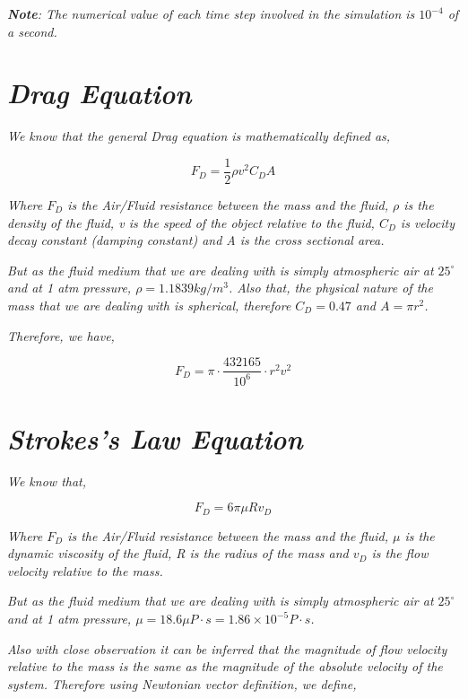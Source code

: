 	\textit{\textbf{Note}: The numerical value of each time step involved in the simulation is $10^{-4}$ of a second.}
           
\section{\textit{Drag Equation}}
            
    \textit{We know that the general Drag equation is mathematically defined as,}
            
        $$F_D = \frac{1}{2}\rho v^2C_DA$$
           
    \textit{Where $F_D$ is the Air/Fluid resistance between the mass and the fluid, $\rho$ is the density of the fluid, v is the speed of the object relative to the fluid, $C_D$ is velocity decay constant (damping constant) and A is the cross sectional area.}
            
    \textit{But as the fluid medium that we are dealing with is simply atmospheric air at $25^\circ$ and at 1 atm pressure, $\rho = 1.1839 kg/m^3$. Also that, the physical nature of the mass that we are dealing with is spherical, therefore $C_D = 0.47$ and $A = \pi r^2$.}
            
    \textit{Therefore, we have,}
            
        $$F_D = \pi\cdot\frac{432165}{10^{6}}\cdot r^2v^2$$
            
\section{\textit{Strokes's Law Equation}}
            
    \textit{We know that,}
            
        $$F_D = 6\pi\mu Rv_D$$
            
    \textit{Where $F_D$ is the Air/Fluid resistance between the mass and the fluid, $\mu$ is the dynamic viscosity of the fluid, R is the radius of the mass and $v_D$ is the flow velocity relative to the mass.}
            
    \textit{But as the fluid medium that we are dealing with is simply atmospheric air at $25^\circ$ and at 1 atm pressure, $\mu = 18.6 \mu P\cdot s = 1.86 \times 10^{-5} P\cdot s$.}
            
    \textit{Also with close observation it can be inferred that the magnitude of flow velocity relative to the mass is the same as the magnitude of the absolute velocity of the system. Therefore using Newtonian vector definition, we define,}
            
